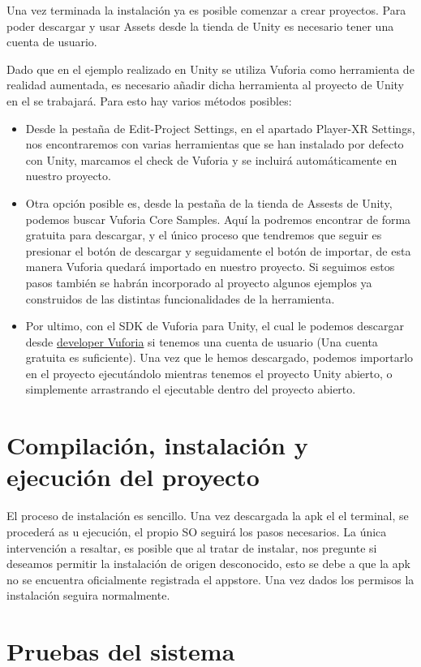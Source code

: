 Una vez terminada la instalación ya es posible comenzar a crear proyectos. 
Para poder descargar y usar Assets desde la tienda de Unity es necesario tener una cuenta de usuario.

Dado que en el ejemplo realizado en Unity se utiliza Vuforia como herramienta de realidad aumentada, es necesario añadir dicha herramienta al proyecto de Unity en el se trabajará. Para esto hay varios métodos posibles:
\begin{itemize}
\item Desde la pestaña de Edit-Project Settings, en el apartado Player-XR Settings, nos encontraremos con varias herramientas que se han instalado por defecto con Unity, marcamos el check de Vuforia y se incluirá automáticamente en nuestro proyecto.

\item Otra opción posible es, desde la pestaña de la tienda de Assests de Unity, podemos buscar Vuforia Core Samples. Aquí la podremos encontrar de forma gratuita para descargar, y el único proceso que tendremos que seguir es presionar el botón de descargar y seguidamente el botón de importar, de esta manera Vuforia quedará importado en nuestro proyecto. Si seguimos estos pasos también se habrán incorporado al proyecto algunos ejemplos ya construidos de las distintas funcionalidades de la herramienta.

\item Por ultimo, con el SDK de Vuforia para Unity, el cual le podemos descargar desde \href{https://developer.vuforia.com/downloads/sdk}{developer Vuforia} si tenemos una cuenta de usuario (Una cuenta gratuita es suficiente). Una vez que le hemos descargado, podemos importarlo en el proyecto ejecutándolo mientras tenemos el proyecto Unity abierto, o simplemente arrastrando el ejecutable dentro del proyecto abierto.	
\end{itemize}


\section{Compilación, instalación y ejecución del proyecto}

El proceso de instalación es sencillo. Una vez descargada la apk el el terminal, se procederá as u ejecución, el propio SO seguirá los pasos necesarios. La única intervención a resaltar, es posible que al tratar de instalar, nos pregunte si deseamos permitir la instalación de origen desconocido, esto se debe a que la apk no se encuentra oficialmente registrada el appstore. Una vez dados los permisos la instalación seguira normalmente.

\section{Pruebas del sistema}
